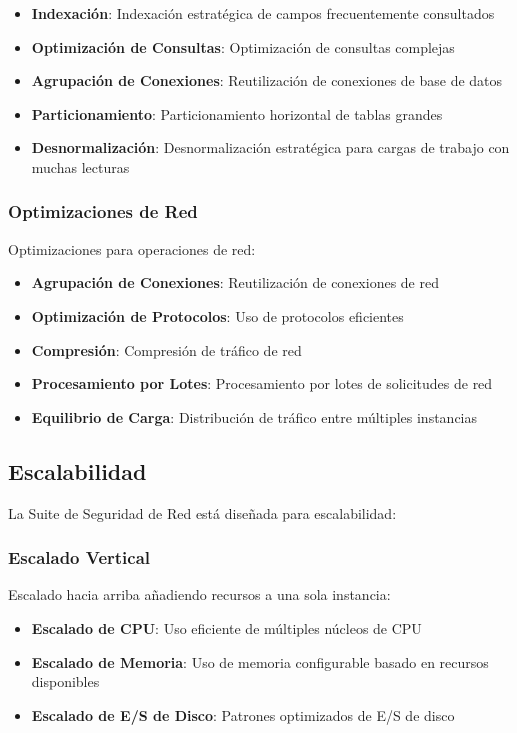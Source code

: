 \begin{itemize}
    \item \textbf{Indexación}: Indexación estratégica de campos frecuentemente consultados
    \item \textbf{Optimización de Consultas}: Optimización de consultas complejas
    \item \textbf{Agrupación de Conexiones}: Reutilización de conexiones de base de datos
    \item \textbf{Particionamiento}: Particionamiento horizontal de tablas grandes
    \item \textbf{Desnormalización}: Desnormalización estratégica para cargas de trabajo con muchas lecturas
\end{itemize}

\subsubsection{Optimizaciones de Red}
Optimizaciones para operaciones de red:

\begin{itemize}
    \item \textbf{Agrupación de Conexiones}: Reutilización de conexiones de red
    \item \textbf{Optimización de Protocolos}: Uso de protocolos eficientes
    \item \textbf{Compresión}: Compresión de tráfico de red
    \item \textbf{Procesamiento por Lotes}: Procesamiento por lotes de solicitudes de red
    \item \textbf{Equilibrio de Carga}: Distribución de tráfico entre múltiples instancias
\end{itemize}

\subsection{Escalabilidad}
La Suite de Seguridad de Red está diseñada para escalabilidad:

\subsubsection{Escalado Vertical}
Escalado hacia arriba añadiendo recursos a una sola instancia:

\begin{itemize}
    \item \textbf{Escalado de CPU}: Uso eficiente de múltiples núcleos de CPU
    \item \textbf{Escalado de Memoria}: Uso de memoria configurable basado en recursos disponibles
    \item \textbf{Escalado de E/S de Disco}: Patrones optimizados de E/S de disco
\end{itemize}

